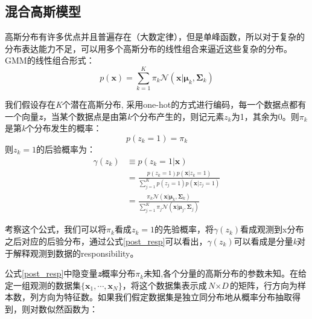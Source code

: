 \documentclass{article}
\begin{document}
\begin{CJK*}{UTF8}{gbsn}
\section{混合高斯模型}
\par
高斯分布有许多优点并且普遍存在（大数定律），但是单峰函数，所以对于复杂的分布表达能力不足，可以用多个高斯分布的线性组合来逼近这些复杂的分布。 GMM的线性组合形式：
\begin{equation}
    p(\textbf{x})=\sum_{k=1}^{K}\pi_k\mathcal{N}(\textbf{x}|\boldsymbol{\mu}_k,\boldsymbol{\Sigma}_k)
\end{equation}
\par
我们假设存在\textit{K}个潜在高斯分布, 采用one-hot的方式进行编码，每一个数据点都有一个向量\textit{\textbf{z}}，当某个数据点是由第\textit{k}个分布产生的，则记元素$\textit{z}_k$为1，其余为0。则$\pi_k$是第\textit{k}个分布发生的概率：
\begin{equation} \label{post_resp}
    p(z_k=1) = \pi_k
\end{equation}
则$z_k=1$的后验概率为：
\begin{equation}
\begin{split}
    \gamma(z_k) &\equiv p(z_k=1|\mathbf{x}) \\
    & = \frac{p(z_k=1)p(\mathbf{x}|z_k=1)}{\sum_{j=1}^{K}p(z_j=1)p(\mathbf{x}|z_j=1)} \\
    & = \frac{\pi_k\mathcal{N}(\textbf{x}|\boldsymbol{\mu}_k,\boldsymbol{\Sigma}_k)}{\sum_{j=1}^{K}\pi_j\mathcal{N}(\textbf{x}|\boldsymbol{\mu}_j,\boldsymbol{\Sigma}_j)}
\end{split}
\end{equation}
\par
考察这个公式，我们可以将$\pi_k$看成$z_k=1$的先验概率，将$\gamma(z_k)$看成观测到x分布之后对应的后验分布，通过公式\ref{post_resp}可以看出，$\gamma(z_k)$可以看成是分量\textit{k}对于解释观测到数据的responsibility。
\par
公式\ref{post_resp}中隐变量\textit{\textbf{z}}概率分布$\pi_k$未知,各个分量的高斯分布的参数未知。在给定一组观测的数据集$\{\boldsymbol{x}_1,\cdots,\boldsymbol{x}_N\}$，将这个数据集表示成$\textit{N}\times\textit{D}$的矩阵，行方向为样本数，列方向为特征数。如果我们假定数据集是独立同分布地从概率分布抽取得到，则对数似然函数为：


\end{CJK*}
\end{document}
